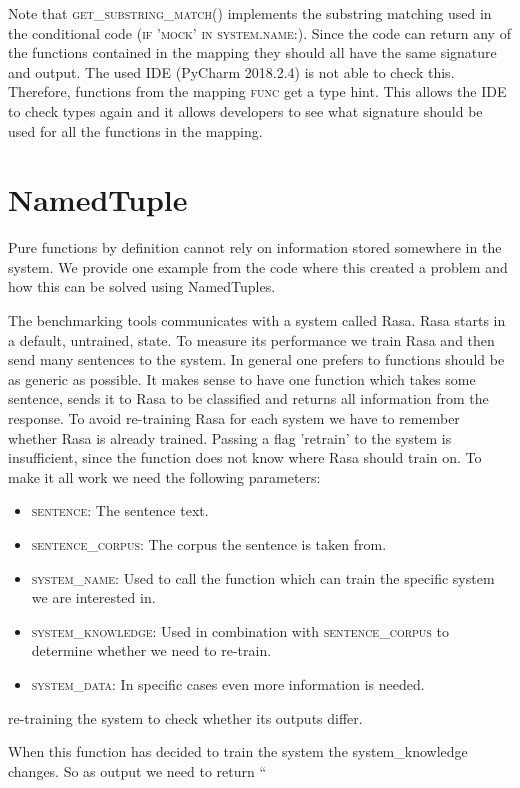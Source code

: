 Note that \textsc{get\_substring\_match()} implements the substring matching used in the conditional code (\textsc{if 'mock' in system.name:}).
Since the code can return any of the functions contained in the mapping they should all have the same signature and output.
The used IDE (PyCharm 2018.2.4) is not able to check this.
Therefore, functions from the mapping \textsc{func} get a type hint.
This allows the IDE to check types again and it allows developers to see what signature should be used for all the functions in the mapping.

\section{NamedTuple}
\label{sec:named_tuple}
Pure functions by definition cannot rely on information stored somewhere in the system.
We provide one example from the code where this created a problem and how this can be solved using NamedTuples.

The benchmarking tools communicates with a system called Rasa.
Rasa starts in a default, untrained, state.
To measure its performance we train Rasa and then send many sentences to the system.
In general one prefers to functions should be as generic as possible.
It makes sense to have one function which takes some sentence, sends it to Rasa to be classified and returns all information from the response.
To avoid re-training Rasa for each system we have to remember whether Rasa is already trained.
Passing a flag 'retrain' to the system is insufficient, since the function does not know where Rasa should train on.
To make it all work we need the following parameters:
\begin{itemize}
    \item \textsc{sentence}: The sentence text.
    \item \textsc{sentence\_corpus}: The corpus the sentence is taken from.
    \item \textsc{system\_name}: Used to call the function which can train the specific system we are interested in.
    \item \textsc{system\_knowledge}: Used in combination with \textsc{sentence\_corpus} to determine whether we need to re-train.
    \item \textsc{system\_data}: In specific cases even more information is needed.
\end{itemize}
re-training the system to check whether its outputs differ.

When this function has decided to train the system the system\_knowledge changes.
So as output we need to return ``

